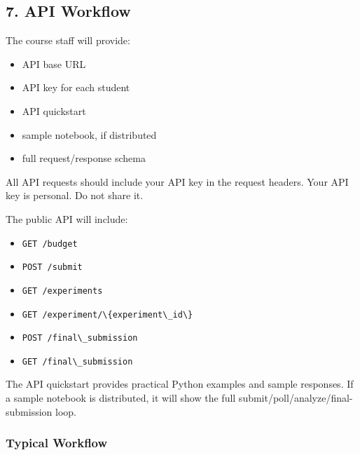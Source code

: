 \documentclass[
  11pt,
]{article}
\newcommand{\passthrough}[1]{#1}
\providecommand{\tightlist}{%
  \setlength{\itemsep}{0pt}\setlength{\parskip}{0pt}}
\begin{document}
\hypertarget{api-workflow}{%
\subsection{7. API Workflow}\label{api-workflow}}

The course staff will provide:

\begin{itemize}
\tightlist
\item
  API base URL
\item
  API key for each student
\item
  API quickstart
\item
  sample notebook, if distributed
\item
  full request/response schema
\end{itemize}

All API requests should include your API key in the request headers.
Your API key is personal. Do not share it.

The public API will include:

\begin{itemize}
\tightlist
\item
  \passthrough{\lstinline!GET /budget!}
\item
  \passthrough{\lstinline!POST /submit!}
\item
  \passthrough{\lstinline!GET /experiments!}
\item
  \passthrough{\lstinline!GET /experiment/\{experiment\_id\}!}
\item
  \passthrough{\lstinline!POST /final\_submission!}
\item
  \passthrough{\lstinline!GET /final\_submission!}
\end{itemize}

The API quickstart provides practical Python examples and sample
responses. If a sample notebook is distributed, it will show the full
submit/poll/analyze/final-submission loop.

\hypertarget{typical-workflow}{%
\subsubsection{Typical Workflow}\label{typical-workflow}}
\end{document}
